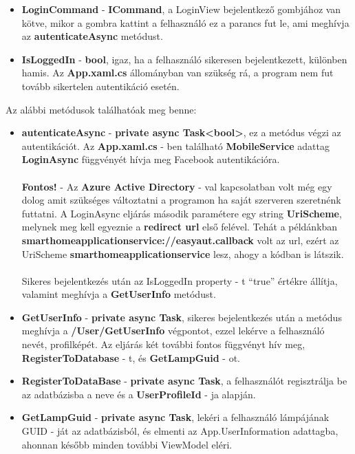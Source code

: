 \documentclass[a4paper,12pt]{report}
\begin{document}
    \begin{itemize}
        \item \textbf{LoginCommand} - \textbf{ICommand}, a LoginView bejelentkező gombjához van kötve, mikor a gombra kattint a felhasználó
        ez a parancs fut le, ami meghívja az \textbf{autenticateAsync} metódust.
        \item \textbf{IsLoggedIn} - \textbf{bool}, igaz, ha a felhasználó sikeresen bejelentkezett, különben hamis. Az \textbf{App.xaml.cs}
        állományban van szükség rá, a program nem fut tovább sikertelen autentikáció esetén.
    \end{itemize}

    Az alábbi metódusok találhatóak meg benne:

    \begin{itemize}
        \item \textbf{autenticateAsync} - \textbf{private async Task<bool>}, ez a metódus végzi az autentikációt. Az \textbf{App.xaml.cs} - ben
        található \textbf{MobileService} adattag \textbf{LoginAsync} függvényét hívja meg Facebook autentikációra. \\
        \\\textbf{Fontos!} - Az \textbf{Azure Active Directory} - val kapcsolatban volt még egy dolog amit szükséges változtatni a programon ha saját
        szerveren szeretnénk futtatni. A LoginAsync eljárás második paramétere egy string \textbf{UriScheme}, melynek meg kell egyeznie
        a \textbf{redirect url} első felével. Tehát a példánkban \textbf{smarthomeapplicationservice://easyaut.callback} volt az url,
        ezért az UriScheme \textbf{smarthomeapplicationservice} lesz, ahogy a kódban is látszik.\\
        \\Sikeres bejelentkezés után az IsLoggedIn property - t ``true'' értékre állítja, valamint meghívja a \textbf{GetUserInfo} metódust.
        \item \textbf{GetUserInfo} - \textbf{private async Task}, sikeres bejelentkezés után a metódus meghívja a \textbf{/User/GetUserInfo} végpontot,
        ezzel lekérve a felhasználó nevét, profilképét. Az eljárás két további fontos függvényt hív meg, \textbf{RegisterToDatabase} - t, és \textbf{GetLampGuid} - ot.
        \item \textbf{RegisterToDataBase} - \textbf{private async Task}, a felhasználót regisztrálja be az adatbázisba a neve és a \textbf{UserProfileId} - ja alapján.
        \item \textbf{GetLampGuid} - \textbf{private async Task}, lekéri a felhasználó lámpájának GUID - ját az adatbázisból, és elmenti
        az App.UserInformation adattagba, ahonnan később minden további ViewModel eléri.
    \end{itemize}
\end{document}
